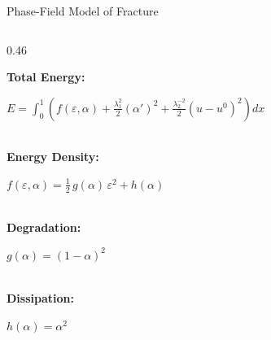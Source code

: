 \documentclass[10pt, aspectratio=169]{beamer}
\begin{document}
\begin{frame}{Phase-Field Model of Fracture}
    \vspace{-0.1cm}
    \begin{columns}[c, onlytextwidth]

        \begin{column}{0.46\textwidth}

            {\footnotesize\bfseries\color{AcademicNavy} Total Energy:}\\[0.08cm]
            \colorbox{gray!10}{%
                \begin{minipage}{\linewidth}
                    \vspace{0.08cm}
                    {\small$\displaystyle E = \int_0^1 \!\left( f(\varepsilon,\alpha) + \frac{\lambda_1^2}{2}(\alpha')^2 + \frac{\lambda_2^{-2}}{2}(u-u^0)^2 \right) dx$}
                    \vspace{0.08cm}
                \end{minipage}%
            }\\[0.18cm]

            {\footnotesize\bfseries\color{AcademicNavy} Energy Density:}\\[0.08cm]
            \colorbox{gray!10}{%
                \begin{minipage}{\linewidth}
                    \vspace{0.08cm}
                    {\small$\displaystyle f(\varepsilon,\alpha) = \tfrac{1}{2}\,g(\alpha)\,\varepsilon^2 + h(\alpha)$}
                    \vspace{0.08cm}
                \end{minipage}%
            }\\[0.18cm]

            {\footnotesize\bfseries\color{AcademicNavy} Degradation:}\\[0.08cm]
            \colorbox{gray!10}{%
                \begin{minipage}{\linewidth}
                    \vspace{0.08cm}
                    {\small$g(\alpha) = (1-\alpha)^2$}
                    \vspace{0.08cm}
                \end{minipage}%
            }\\[0.14cm]

            {\footnotesize\bfseries\color{AcademicNavy} Dissipation:}\\[0.08cm]
            \colorbox{gray!10}{%
                \begin{minipage}{\linewidth}
                    \vspace{0.08cm}
                    {\small$h(\alpha) = \alpha^2$}
                    \vspace{0.08cm}
                \end{minipage}%
            }


\end{column}
\end{columns}
\end{frame}
\end{document}
